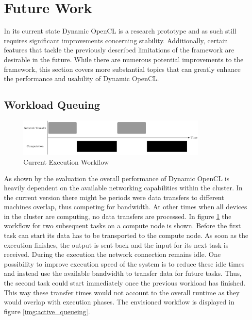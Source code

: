 \section{Future Work}

In its current state Dynamic OpenCL is a research prototype and as such still requires significant improvements concerning stability. Additionally, certain features that tackle the previously described limitations of the framework are desirable in the future. While there are numerous potential improvements to the framework, this section covers more substantial topics that can greatly enhance the performance and usability of Dynamic OpenCL.

\subsection{Workload Queuing}

\begin{figure}[!htb]	
	\includegraphics[width=0.85\textwidth]{drawings/missing_queue.pdf}
	\centering
	\caption{Current Execution Workflow}
	\label{img:missing_queuing}
\end{figure}
As shown by the evaluation the overall performance of Dynamic OpenCL is heavily dependent on the available networking capabilities within the cluster. In the current version there might be periods were data transfers to different machines overlap, thus competing for bandwidth. At other times when all devices in the cluster are computing, no data transfers are processed. In figure \ref{img:missing_queuing} the workflow for two subsequent tasks on a compute node is shown. Before the first task can start its data has to be transported to the compute node. As soon as the execution finishes, the output is sent back and the input for its next task is received. During the execution the network connection remains idle. One possibility to improve execution speed of the system is to reduce these idle times and instead use the available bandwidth to transfer data for future tasks. Thus, the second task could start immediately once the previous workload has finished. This way these transfer times would not account to the overall runtime as they would overlap with execution phases. The envisioned workflow is displayed in figure \ref{img:active_queueing}.

